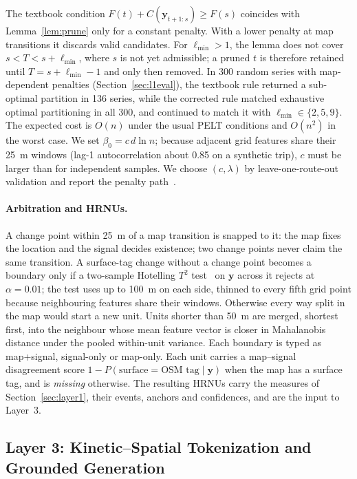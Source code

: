 The textbook condition $F(t)+C(\mathbf y_{t+1:s})\ge F(s)$ coincides with Lemma~\ref{lem:prune} only for a constant penalty.
With a lower penalty at map transitions it discards valid candidates.
For $\ell_{\min}>1$, the lemma does not cover $s<T<s+\ell_{\min}$, where $s$ is not yet admissible; a pruned $t$ is therefore retained until $T=s+\ell_{\min}-1$ and only then removed.
In 300 random series with map-dependent penalties (Section~\ref{sec:l1eval}), the textbook rule returned a sub-optimal partition in 136 series, while the corrected rule matched exhaustive optimal partitioning in all 300, and continued to match it with $\ell_{\min}\in\{2,5,9\}$.
The expected cost is $O(n)$ under the usual PELT conditions and $O(n^2)$ in the worst case.
We set $\beta_0=c\,d\ln n$; because adjacent grid features share their 25~m windows (lag-1 autocorrelation about 0.85 on a synthetic trip), $c$ must be larger than for independent samples.
We choose $(c,\lambda)$ by leave-one-route-out validation and report the penalty path~\cite{haynes2017crops}.

\paragraph{Arbitration and HRNUs.}
A change point within 25~m of a map transition is snapped to it: the map fixes the location and the signal decides existence; two change points never claim the same transition.
A surface-tag change without a change point becomes a boundary only if a two-sample Hotelling $T^2$ test~\cite{hotelling1931t2} on $\mathbf y$ across it rejects at $\alpha=0.01$; the test uses up to 100~m on each side, thinned to every fifth grid point because neighbouring features share their windows.
Otherwise every way split in the map would start a new unit.
Units shorter than 50~m are merged, shortest first, into the neighbour whose mean feature vector is closer in Mahalanobis distance under the pooled within-unit variance.
Each boundary is typed as map+signal, signal-only or map-only.
Each unit carries a map--signal disagreement score $1-P(\text{surface}=\text{OSM tag}\mid\mathbf y)$ when the map has a surface tag, and is \emph{missing} otherwise.
The resulting HRNUs carry the measures of Section~\ref{sec:layer1}, their events, anchors and confidences, and are the input to Layer~3.

\subsection{Layer 3: Kinetic--Spatial Tokenization and Grounded Generation}
\label{sec:layer3}

